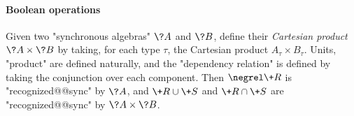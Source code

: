
\paragraph*{Boolean operations}
\AP Given two "synchronous algebras" $\?A$ and $\?B$, define their \emph{Cartesian product}
$\?A \times \?B$ by taking, for each type $\tau$, the Cartesian product $A_\tau \times B_\tau$. 
Units, "product" are defined naturally, and the "dependency relation" is defined
by taking the conjunction over each component.
Then $\negrel \+R$ is "recognized@@sync" by $\?A$, and
$\+R \cup \+S$ and $\+R \cap \+S$ are "recognized@@sync" by $\?A \times \?B$. 


